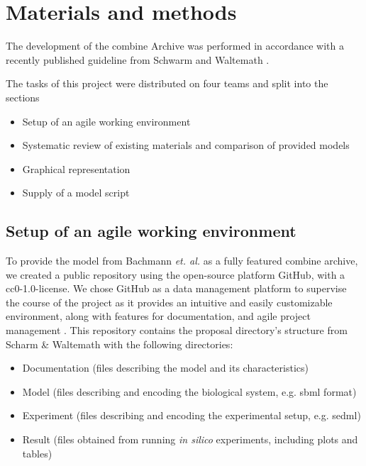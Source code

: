 \section*{Materials and methods} \label{sec:matmet}

The development of the \ac{combine} Archive was performed in accordance with a recently published guideline from Schwarm and Waltemath \cite{combine}.

The tasks of this project were distributed on  four teams and split into the sections 
\begin{itemize}
    \item Setup of an agile working environment
    \item Systematic review of existing materials and comparison of provided models
    \item Graphical representation
    \item Supply of a model script
\end{itemize}

\subsection*{Setup of an agile working environment} \label{setupagwork}
To provide the model from Bachmann \textit{et. al.} \cite{bachmannmodel} as a fully featured \ac{combine} archive, we created a public repository using the open-source platform GitHub, with a \ac{cc}0-1.0-license. We chose GitHub as a data management platform to supervise the course of the project as it provides an intuitive and easily customizable environment, along with features for documentation, and agile project management \cite{github}. This repository contains the proposal directory's structure from Scharm \& Waltemath \cite{combine} with the following directories:
\begin{itemize}
    \item Documentation (files describing the model and its characteristics)
    \item Model (files describing and encoding the biological system, e.g. \ac{sbml} format)
    \item Experiment (files describing and encoding the experimental setup, e.g. \ac{sedml})
    \item Result (files obtained from running \textit{in silico} experiments, including plots and tables)
\end{itemize}



